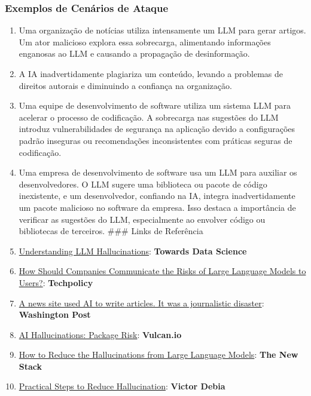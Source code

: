 \documentclass[
]{article}
\begin{document}
\subsubsection{Exemplos de Cenários de
Ataque}\label{exemplos-de-cenuxe1rios-de-ataque}

\begin{enumerate}
\def\labelenumi{\arabic{enumi}.}
\item
  Uma organização de notícias utiliza intensamente um LLM para gerar
  artigos. Um ator malicioso explora essa sobrecarga, alimentando
  informações enganosas ao LLM e causando a propagação de desinformação.
\item
  A IA inadvertidamente plagiariza um conteúdo, levando a problemas de
  direitos autorais e diminuindo a confiança na organização.
\item
  Uma equipe de desenvolvimento de software utiliza um sistema LLM para
  acelerar o processo de codificação. A sobrecarga nas sugestões do LLM
  introduz vulnerabilidades de segurança na aplicação devido a
  configurações padrão inseguras ou recomendações inconsistentes com
  práticas seguras de codificação.
\item
  Uma empresa de desenvolvimento de software usa um LLM para auxiliar os
  desenvolvedores. O LLM sugere uma biblioteca ou pacote de código
  inexistente, e um desenvolvedor, confiando na IA, integra
  inadvertidamente um pacote malicioso no software da empresa. Isso
  destaca a importância de verificar as sugestões do LLM, especialmente
  ao envolver código ou bibliotecas de terceiros. \#\#\# Links de
  Referência
\item
  \href{https://towardsdatascience.com/llm-hallucinations-ec831dcd7786}{Understanding
  LLM Hallucinations}: \textbf{Towards Data Science}
\item
  \href{https://techpolicy.press/how-should-companies-communicate-the-risks-of-large-language-models-to-users/}{How
  Should Companies Communicate the Risks of Large Language Models to
  Users?}: \textbf{Techpolicy}
\item
  \href{https://www.washingtonpost.com/media/2023/01/17/cnet-ai-articles-journalism-corrections/}{A
  news site used AI to write articles. It was a journalistic disaster}:
  \textbf{Washington Post}
\item
  \href{https://vulcan.io/blog/ai-hallucinations-package-risk}{AI
  Hallucinations: Package Risk}: \textbf{Vulcan.io}
\item
  \href{https://thenewstack.io/how-to-reduce-the-hallucinations-from-large-language-models/}{How
  to Reduce the Hallucinations from Large Language Models}: \textbf{The
  New Stack}
\item
  \href{https://newsletter.victordibia.com/p/practical-steps-to-reduce-hallucination}{Practical
  Steps to Reduce Hallucination}: \textbf{Victor Debia}
\end{enumerate}
\end{document}

